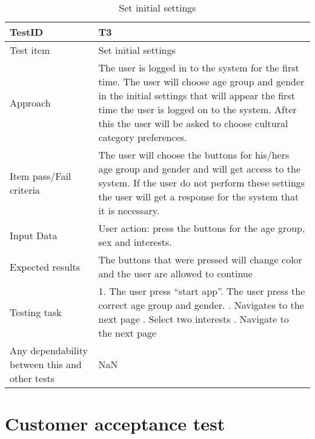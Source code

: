 \begin{table}[!h]
	\begin{center}
		\begin{tabular}{| p{5cm} | p{12cm} |}
			\hline
			TestID & T3 \\ \hline
			Test item & Set initial settings  \\ \hline
			
			Approach & The user is logged in to the system for the first time. The user will choose age group and gender in the initial settings that will appear the first time the user is logged on to the system. After this the user will be asked to choose cultural category preferences.   \\ \hline
			
			Item pass/Fail criteria & The user will choose the buttons for his/hers age group and gender and will get access to the system. If the user do not perform these settings the user will get a response for the system that it is necessary.  \\ \hline
			
			Input Data & User action: press the buttons for the age group, sex and interests.   \\ \hline
			
			Expected results & The buttons that were pressed will change color and the user are allowed to continue   \\ \hline
			
			Testing task & 1. The user press “start app”\newline 2. The user press the correct age group and gender. \newline
			3. Navigates to the next page \newline 4. Select two interests \newline 5. Navigate to the next page  \\ \hline
			
			Any dependability between this and other tests & NaN \\ \hline
		\end{tabular}
	\end{center}
	\caption{Set initial settings}
	\label{Tab:systemtest2}
\end{table}

\section{Customer acceptance test}
\label{sec:acceptance_test}

